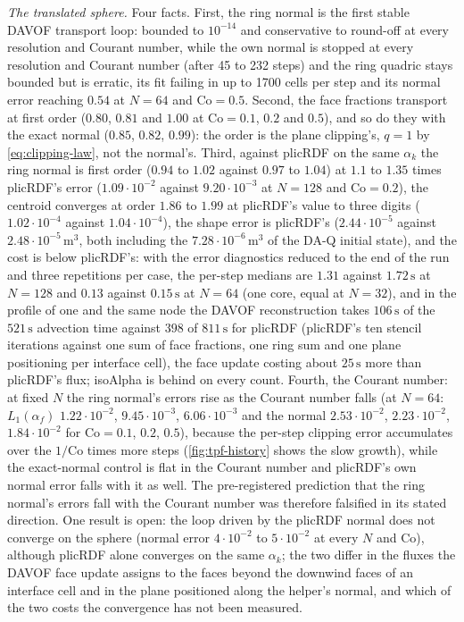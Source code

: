 \documentclass[preprint,12pt]{elsarticle}
\begin{document}
\emph{The translated sphere.} Four facts. First, the ring normal is the first stable DAVOF transport loop: bounded to $10^{-14}$ and conservative to round-off at every resolution and Courant number, while the own normal is stopped at every resolution and Courant number (after 45 to 232 steps) and the ring quadric stays bounded but is erratic, its fit failing in up to 1700 cells per step and its normal error reaching $0.54$ at $N = 64$ and $\mathrm{Co} = 0.5$. Second, the face fractions transport at first order ($0.80$, $0.81$ and $1.00$ at $\mathrm{Co} = 0.1$, $0.2$ and $0.5$), and so do they with the exact normal ($0.85$, $0.82$, $0.99$): the order is the plane clipping's, $q = 1$ by \cref{eq:clipping-law}, not the normal's. Third, against plicRDF on the same $\alpha_k$ the ring normal is first order ($0.94$ to $1.02$ against $0.97$ to $1.04$) at $1.1$ to $1.35$ times plicRDF's error ($1.09\cdot10^{-2}$ against $9.20\cdot10^{-3}$ at $N = 128$ and $\mathrm{Co} = 0.2$), the centroid converges at order $1.86$ to $1.99$ at plicRDF's value to three digits ($1.02\cdot10^{-4}$ against $1.04\cdot10^{-4}$), the shape error is plicRDF's ($2.44\cdot10^{-5}$ against $2.48\cdot10^{-5}\,\mathrm{m^3}$, both including the $7.28\cdot10^{-6}\,\mathrm{m^3}$ of the DA-Q initial state), and the cost is below plicRDF's: with the error diagnostics reduced to the end of the run and three repetitions per case, the per-step medians are $1.31$ against $1.72\,\mathrm{s}$ at $N = 128$ and $0.13$ against $0.15\,\mathrm{s}$ at $N = 64$ (one core, equal at $N = 32$), and in the profile of one and the same node the DAVOF reconstruction takes $106\,\mathrm{s}$ of the $521\,\mathrm{s}$ advection time against $398$ of $811\,\mathrm{s}$ for plicRDF (plicRDF's ten stencil iterations against one sum of face fractions, one ring sum and one plane positioning per interface cell), the face update costing about $25\,\mathrm{s}$ more than plicRDF's flux; isoAlpha is behind on every count. Fourth, the Courant number: at fixed $N$ the ring normal's errors rise as the Courant number falls (at $N = 64$: $L_1(\alpha_f)$ $1.22\cdot10^{-2}$, $9.45\cdot10^{-3}$, $6.06\cdot10^{-3}$ and the normal $2.53\cdot10^{-2}$, $2.23\cdot10^{-2}$, $1.84\cdot10^{-2}$ for $\mathrm{Co} = 0.1$, $0.2$, $0.5$), because the per-step clipping error accumulates over the $1/\mathrm{Co}$ times more steps (\cref{fig:tpf-history} shows the slow growth), while the exact-normal control is flat in the Courant number and plicRDF's own normal error falls with it as well. The pre-registered prediction that the ring normal's errors fall with the Courant number was therefore falsified in its stated direction. One result is open: the loop driven by the plicRDF normal does not converge on the sphere (normal error $4\cdot10^{-2}$ to $5\cdot10^{-2}$ at every $N$ and $\mathrm{Co}$), although plicRDF alone converges on the same $\alpha_k$; the two differ in the fluxes the DAVOF face update assigns to the faces beyond the downwind faces of an interface cell and in the plane positioned along the helper's normal, and which of the two costs the convergence has not been measured.
\end{document}
